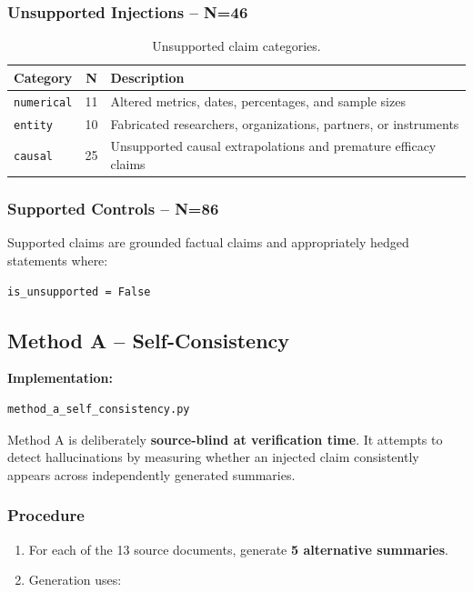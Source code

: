 \documentclass[11pt,a4paper]{article}
\begin{document}
\subsubsection{Unsupported Injections -- N=46}

\begin{table}[h]
\centering
\begin{tabular}{lcl}
\toprule
\textbf{Category} & \textbf{N} & \textbf{Description} \\
\midrule
\texttt{numerical} & 11 & Altered metrics, dates, percentages, and sample sizes \\
\texttt{entity} & 10 & Fabricated researchers, organizations, partners, or instruments \\
\texttt{causal} & 25 & Unsupported causal extrapolations and premature efficacy claims \\
\bottomrule
\end{tabular}
\caption{Unsupported claim categories.}
\end{table}

\subsubsection{Supported Controls -- N=86}

Supported claims are grounded factual claims and appropriately hedged statements where:

\begin{lstlisting}
is_unsupported = False
\end{lstlisting}


\subsection{Method A -- Self-Consistency}

\textbf{Implementation:}

\begin{lstlisting}
method_a_self_consistency.py
\end{lstlisting}

Method A is deliberately \textbf{source-blind at verification time}. It attempts to detect hallucinations by measuring whether an injected claim consistently appears across independently generated summaries.

\subsubsection{Procedure}

\begin{enumerate}
    \item For each of the 13 source documents, generate \textbf{5 alternative summaries}.
    \item Generation uses:
\end{enumerate}
\end{document}
